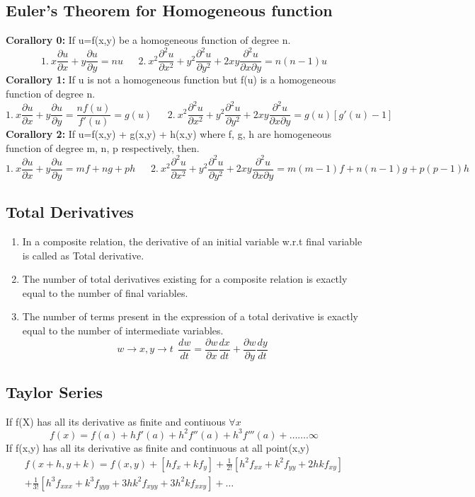 \subsection*{Euler's Theorem for Homogeneous function}
\begin{fleqn}
\textbf{Corallory 0:} If u=f(x,y) be a homogeneous function of degree n.
\[1.\ x\frac{\partial u}{\partial x} + y\frac{\partial u}{\partial y}=nu\ \ \ \ \ \ \
  2.\ x^2\frac{\partial^2 u}{\partial x^2} + y^2\frac{\partial^2 u}{\partial y^2} + 2xy\frac{\partial^2u}{\partial x\partial y}=n(n-1)u \]
\textbf{Corallory 1:} If u is not a homogeneous function but f(u) is a homogeneous function of degree n.
\[1.\ x\frac{\partial u}{\partial x} + y\frac{\partial u}{\partial y}=\frac{nf(u)}{f'(u)}= g(u) \ \ \ \ \ \ \
  2.\ x^2\frac{\partial^2 u}{\partial x^2} + y^2\frac{\partial^2 u}{\partial y^2} + 2xy\frac{\partial^2u}{\partial x\partial y}=g(u)[g'(u)-1] \]
\textbf{Corallory 2:} If u=f(x,y) + g(x,y) + h(x,y) where f, g, h are homogeneous function of degree m, n, p respectively, then.
\[1.\ x\frac{\partial u}{\partial x} + y\frac{\partial u}{\partial y}=mf+ng+ph\ \ \ \ \ \ \
  2.\ x^2\frac{\partial^2 u}{\partial x^2} + y^2\frac{\partial^2 u}{\partial y^2} + 2xy\frac{\partial^2u}{\partial x\partial y}=m(m-1)f+n(n-1)g+p(p-1)h \]
\end{fleqn}


\subsection{Total Derivatives}
\begin{enumerate}
    \item In a composite relation, the derivative of an initial variable w.r.t final variable is called as Total derivative.
    \item The number of total derivatives existing for a composite relation is exactly equal to the number of final variables.
    \item The number of terms present in the expression of a total derivative is exactly equal to the number of intermediate variables.
    \[w\rightarrow x,y\rightarrow t\ \  \frac{dw}{dt}=\frac{\partial w}{\partial x}\frac{dx}{dt}+ \frac{\partial w}{\partial y}\frac{dy}{dt}\]
\end{enumerate}

\subsection*{Taylor Series}
If f(X) has all its derivative as finite and contiuous \(\forall x \)
\[f(x) = f(a) + hf'(a)+h^2f''(a)+h^3f'''(a)+\ldots\ldots.\infty\]
If f(x,y) has all its derivative as finite and continuous at all point(x,y)
\begin{multline*}
f(x+h, y+k)=f(x,y)+[hf_x+kf_y]+\frac{1}{2!}[h^2f_{xx}+k^2f_{yy}+2hkf_{xy}] \\
+\frac{1}{3!}[h^3f_{xxx}+k^3f_{yyy}+3hk^2f_{xyy}+3h^2kf_{xxy}] + \ldots
\end{multline*}

